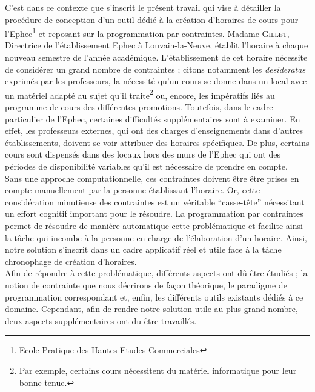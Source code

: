 \newline
\indent
C'est dans ce contexte que s'inscrit le présent travail qui vise à détailler la procédure de conception d'un outil dédié à la création d'horaires de cours pour l'Ephec\footnote{Ecole Pratique des Hautes Etudes Commerciales} et reposant sur la programmation par contraintes.
\newline
\indent
Madame \textsc{Gillet}, Directrice de l'établissement Ephec à Louvain-la-Neuve, établit l'horaire à chaque nouveau semestre de l'année académique. L'établissement de cet horaire nécessite de considérer un grand nombre de contraintes ; citons notamment les \textit{desideratas} exprimés par les professeurs, la nécessité qu'un cours se donne dans un local avec un matériel adapté au sujet qu'il traite\footnote{Par exemple, certains cours nécessitent du matériel informatique pour leur bonne tenue.} ou, encore, les impératifs liés au programme de cours des différentes promotions.
\newline
\indent
Toutefois, dans le cadre particulier de l'Ephec, certaines difficultés supplémentaires sont à examiner. En effet, les professeurs externes, qui ont des charges d'enseignements dans d'autres établissements, doivent se voir attribuer des horaires spécifiques.  De plus, certains cours sont dispensés dans des locaux hors des murs de l'Ephec qui ont des périodes de disponibilité variables qu'il est nécessaire de prendre en compte.\\
\newline
\indent
Sans une approche computationnelle, ces contraintes doivent être  être prises en compte manuellement par la personne établissant l'horaire. Or, cette considération minutieuse des contraintes est un véritable \enquote{casse-tête} nécessitant un effort cognitif important pour le résoudre. 
\newline
\indent
La programmation par contraintes permet de résoudre de manière automatique cette problématique et facilite ainsi la tâche qui incombe à la personne en charge de l'élaboration d'un horaire. Ainsi, notre solution s'inscrit dans un cadre applicatif réel et  utile face à la tâche chronophage de création d'horaires. \\
\newline
\indent
Afin de répondre à cette problématique, différents aspects ont dû être étudiés ; la notion de contrainte que nous décrirons de façon théorique, le paradigme de programmation correspondant et, enfin,  les différents outils existants dédiés à ce domaine. Cependant, afin de rendre notre solution utile au plus grand nombre, deux aspects supplémentaires ont du être travaillés.
